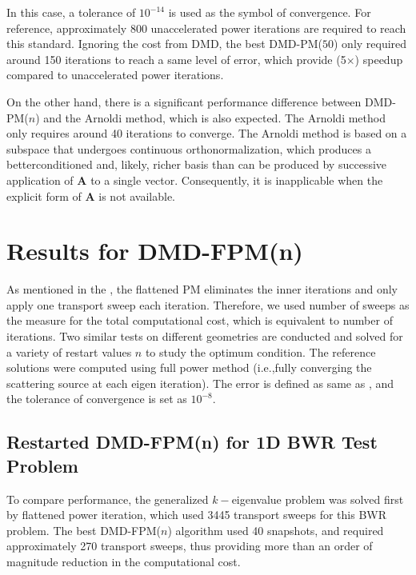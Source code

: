 In this case, a tolerance of $10^{-14}$ is used as the symbol of convergence.
For reference, approximately 800 unaccelerated power iterations are required to reach this standard.
Ignoring the cost from DMD, the best DMD-PM($50$) only required around 150 iterations to reach a same level of error, which provide (5$\times$) speedup compared to unaccelerated power iterations.

On the other hand, there is a significant performance difference between DMD-PM($n$) and the Arnoldi method, which is also expected.
The Arnoldi method only requires around 40 iterations to converge.
The Arnoldi method is based on a subspace that undergoes continuous orthonormalization, which produces a betterconditioned and, likely, richer basis than can be produced by successive application of $\mathbf{A}$ to a single vector.
Consequently, it is inapplicable when the explicit form of $\mathbf{A}$ is not available.  

\section{Results for DMD-FPM(n)}
As mentioned in the , the flattened PM eliminates the inner iterations and only apply one transport sweep each iteration.
Therefore, we used number of sweeps as the measure for the total computational cost, which is equivalent to number of iterations.
Two similar tests on different geometries are conducted and solved for a variety of restart values $n$ to study the optimum condition.
The reference solutions were computed using full power method (i.e.,fully converging the scattering source at each eigen iteration).
The error is defined as same as , and the tolerance of convergence is set as $10^{-8}$.

\subsection{Restarted DMD-FPM(n) for 1D BWR Test Problem}

To compare performance, the generalized $k-$eigenvalue problem was solved first by flattened power iteration, which used 3445 transport sweeps for this BWR problem.
The best DMD-FPM($n$) algorithm used 40 snapshots, and required approximately 270 transport sweeps, thus providing more than an order of magnitude reduction in the computational cost.

